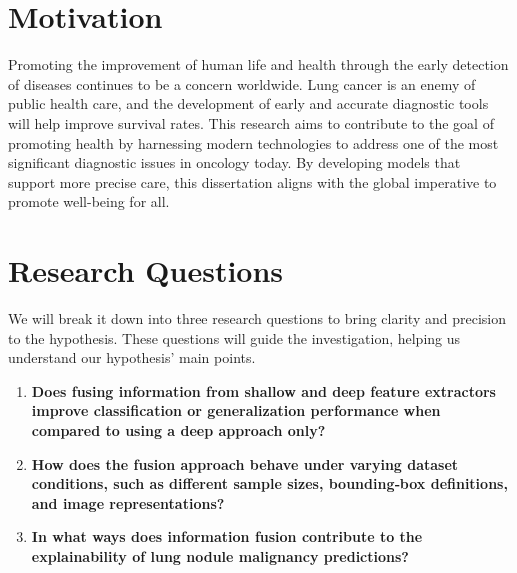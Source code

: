 \section{Motivation}\label{sec:motivation}

Promoting the improvement of human life and health through the early detection of diseases continues to be a concern worldwide. Lung cancer is an enemy of public health care, and the development of early and accurate diagnostic tools will help improve survival rates.
This research aims to contribute to the goal of promoting health by harnessing modern technologies to address one of the most significant diagnostic issues in oncology today. By developing models that support more precise care, this dissertation aligns with the global imperative to promote well-being for all.


\section{Research Questions}\label{sec:questions}
We will break it down into three research questions to bring clarity and precision to the hypothesis. These questions will guide the investigation, helping us understand our hypothesis' main points.

\begin{enumerate}
    \item \textbf{Does fusing information from shallow and deep feature extractors improve classification or generalization performance when compared to using a deep approach only?}\\
    \item \textbf{How does the fusion approach behave under varying dataset conditions, such as different sample sizes, bounding‐box definitions, and image representations?}\\
    \item \textbf{In what ways does information fusion contribute to the explainability of lung nodule malignancy predictions?}\\
\end{enumerate}





